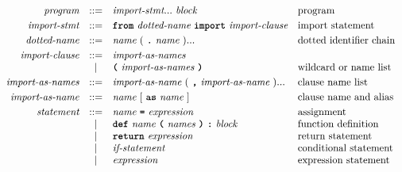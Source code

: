 \[\begin{array}{rcll}

\textit{program}         & ::= & \textit{import-stmt} ... \ \textit{block}                                               & \text{program}                          \\[1mm]
\textit{import-stmt}     & ::= & \term{from}\ \textit{dotted-name}\ \term{import}\ \textit{import-clause}                & \text{import statement}                 \\[1mm]
\textit{dotted-name}     & ::= & \textit{name}\ (\ \term{.}\ \textit{name}\ )...                                         & \text{dotted identifier chain}          \\[1mm]
\textit{import-clause}   & ::= & \textit{import-as-names}                                                                &                                         \\
                         & |   & \term{(}\ \textit{import-as-names}\ \term{)}                                            & \text{wildcard or name list}            \\[1mm]
\textit{import-as-names} & ::= & \textit{import-as-name}\ (\ \term{,}\ \textit{import-as-name}\ )...                     & \text{clause name list}                 \\[1mm]
\textit{import-as-name}  & ::= & \textit{name}\ [\ \term{as}\ \textit{name}\ ]                                           & \text{clause name and alias}            \\[1mm]
\textit{statement}       & ::= & \textit{name}\ \term{=}\ \textit{expression}                                            & \text{assignment}             \\
                         & |   & \term{def}\ \textit{name}\ \term{(}\ \textit{names}\ \term{)}\ \term{:}\ \textit{block} & \text{function definition}             \\
                         & |   & \term{return}\ \textit{expression}                                                      & \text{return statement}                 \\
                         & |   & \textit{if-statement}                                                                   & \text{conditional statement}            \\
                         & |   & \textit{expression}                                                                     & \text{expression statement}             \\[1mm]

\end{array}\]
